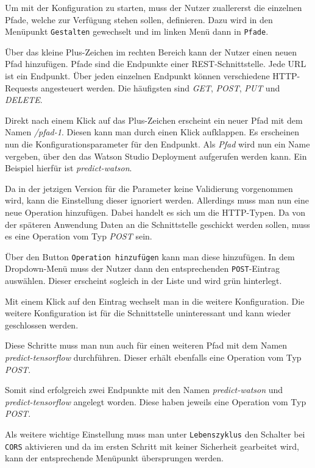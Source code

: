 Um mit der Konfiguration zu starten, muss der Nutzer zuallererst die einzelnen Pfade, welche zur Verfügung stehen sollen,
definieren. Dazu wird in den Menüpunkt \texttt{Gestalten} gewechselt und im linken Menü dann in \texttt{Pfade}.

Über das kleine Plus-Zeichen im rechten Bereich kann der Nutzer einen neuen Pfad hinzufügen. Pfade sind die Endpunkte
einer REST-Schnittstelle. Jede URL ist ein Endpunkt. Über jeden einzelnen Endpunkt können verschiedene HTTP-Requests
angesteuert werden. Die häufigsten sind \textit{GET}, \textit{POST}, \textit{PUT} und \textit{DELETE}.

Direkt nach einem Klick auf das Plus-Zeichen erscheint ein neuer Pfad mit dem Namen \textit{/pfad-1}. Diesen kann man
durch einen Klick aufklappen. Es erscheinen nun die Konfigurationsparameter für den Endpunkt. Als \textit{Pfad} wird nun
ein Name vergeben, über den das Watson Studio Deployment aufgerufen werden kann. Ein Beispiel hierfür ist
\textit{predict-watson}.

Da in der jetzigen Version für die Parameter keine Validierung vorgenommen wird, kann die Einstellung dieser ignoriert
werden. Allerdings muss man nun eine neue Operation hinzufügen. Dabei handelt es sich um die HTTP-Typen. Da von der
späteren Anwendung Daten an die Schnittstelle geschickt werden sollen, muss es eine Operation vom Typ \textit{POST} sein.

Über den Button \texttt{Operation hinzufügen} kann man diese hinzufügen. In dem Dropdown-Menü muss der Nutzer dann den
entsprechenden \texttt{POST}-Eintrag auswählen. Dieser erscheint sogleich in der Liste und wird grün hinterlegt.

Mit einem Klick auf den Eintrag wechselt man in die weitere Konfiguration. Die weitere Konfiguration ist für die
Schnittstelle uninteressant und kann wieder geschlossen werden.

Diese Schritte muss man nun auch für einen weiteren Pfad mit dem Namen \textit{predict-tensorflow} durchführen. Dieser
erhält ebenfalls eine Operation vom Typ \textit{POST}.

Somit sind erfolgreich zwei Endpunkte mit den Namen \textit{predict-watson} und \textit{predict-tensorflow} angelegt worden.
Diese haben jeweils eine Operation vom Typ \textit{POST}.

Als weitere wichtige Einstellung muss man unter \texttt{Lebenszyklus} den Schalter bei \texttt{CORS} aktivieren und da
im ersten Schritt mit keiner Sicherheit gearbeitet wird, kann der entsprechende Menüpunkt übersprungen werden.

